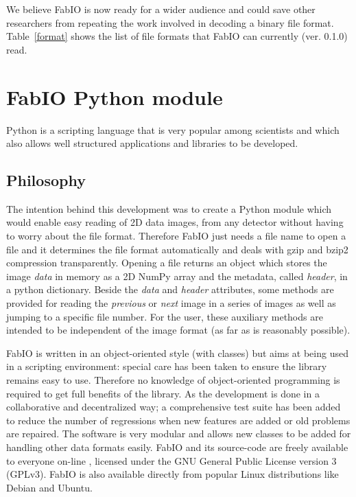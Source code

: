 \documentclass[preprint]{iucr}
\begin{document}
We believe FabIO is now ready for a wider audience and could save other
researchers from repeating the work involved in decoding a
binary file format. Table~\ref{format} shows the list of file formats that
FabIO can currently (ver. 0.1.0) read.


\section{FabIO Python module}

Python \cite{python} is a scripting language that is very popular among scientists
and which also allows well structured applications and libraries to be developed.

\subsection{Philosophy}

The intention behind this development was to create a Python module which would
enable easy reading of 2D data images, from any detector without having to
worry about the file format.
Therefore FabIO just needs a file name to open a file and it determines the
file format automatically and deals with gzip \cite{gzip} and bzip2
\cite{bzip2} compression transparently.
Opening a file returns an object which stores the image
{\em data} in memory as a 2D NumPy array \cite{numpy} and the metadata,
called {\em header}, in a python dictionary. Beside the
{\em data} and {\em header} attributes, some methods are provided for reading
the {\em previous} or {\em next} image in a series of images as well as jumping
to a specific file number.
For the user, these auxiliary methods are intended to be independent of
the image format (as far as is reasonably possible).

FabIO is written in an object-oriented style (with classes) but aims at being
used in a scripting environment: special care has been taken to ensure the 
library remains easy to use. 
Therefore no knowledge of object-oriented programming is required to get 
full benefits of the library. 
As the development is done in a collaborative and decentralized way; a
comprehensive test suite has been added to reduce the number of regressions
when new features are added or old problems are repaired. 
The software is very modular and allows new classes to be added for handling 
other data formats easily.
FabIO and its source-code are freely available to everyone on-line \cite{fabio}, 
licensed under the GNU General Public License version 3 (GPLv3). FabIO is also
available directly from popular Linux distributions like Debian and Ubuntu.
\end{document}
